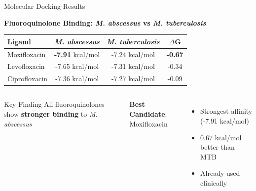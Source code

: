 \documentclass[aspectratio=169,xcolor=table]{beamer}
\begin{document}
\begin{frame}{Molecular Docking Results}

\textbf{Fluoroquinolone Binding: \textit{M. abscessus} vs \textit{M. tuberculosis}}

\vspace{0.2cm}

\begin{table}
\centering
\begin{tabular}{lccc}
\toprule
\textbf{Ligand} & \textbf{\textit{M. abscessus}} & \textbf{\textit{M. tuberculosis}} & \textbf{$\Delta$G} \\
\midrule
\rowcolor{yellow!30} Moxifloxacin & \textbf{-7.91} kcal/mol & -7.24 kcal/mol & \textbf{-0.67} \\
\rowcolor{magenta!20} Levofloxacin & -7.65 kcal/mol & -7.31 kcal/mol & -0.34 \\
\rowcolor{green!20} Ciprofloxacin & -7.36 kcal/mol & -7.27 kcal/mol & -0.09 \\
\bottomrule
\end{tabular}
\end{table}

\vspace{0.2cm}

\begin{columns}
\begin{alertblock}{Key Finding}
All fluoroquinolones show \textbf{stronger binding} to \textit{M. abscessus}
\end{alertblock}

\textbf{Best Candidate}: Moxifloxacin
\begin{itemize}\setlength{\itemsep}{0pt}
    \item Strongest affinity (-7.91 kcal/mol)
    \item 0.67 kcal/mol better than MTB
    \item Already used clinically
\end{itemize}
\end{columns}

\end{frame}

\end{document}
